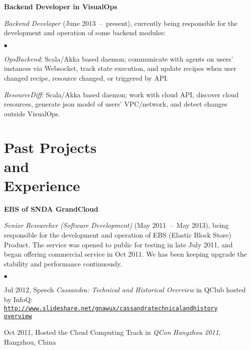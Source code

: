 \documentclass[a4paper,margin,line]{res}
\newenvironment{list1}{
  \begin{list}{\ding{113}}{%
      \setlength{\itemsep}{0in}
      \setlength{\parsep}{0in} \setlength{\parskip}{0in}
      \setlength{\topsep}{0in} \setlength{\partopsep}{0in} 
      \setlength{\leftmargin}{0.17in}}}{\end{list}}
\newenvironment{list2}{
  \begin{list}{$\bullet$}{%
      \setlength{\itemsep}{0in}
      \setlength{\parsep}{0in} \setlength{\parskip}{0in}
      \setlength{\topsep}{0in} \setlength{\partopsep}{0in} 
      \setlength{\leftmargin}{0.2in}}}{\end{list}}
\newcommand{\http}{http:/\hspace{-0.3ex}/}
\newcommand{\hindent}{\mbox{\hspace{8ex}}}
\begin{document}
\begin{resume}
\textbf{Backend Developer in VisualOps}\\
\vspace*{-.1in}
\begin{list1}
\item[] \emph{Backend Developer}\/ (June 2013~--~present), currently being responsible for the development and operation of some backend modules:
\begin{list2}
\vspace*{.05in}
\item \textit{OpsBackend}: Scala/Akka based daemon; communicate with agents on users' instances via Websocket, track state execution, and update recipes when user changed recipe, resource changed, or triggered by API.
\item \textit{ResourceDiff}: Scala/Akka based daemon; work with cloud API, discover cloud resources, generate json model of users' VPC/network, and detect changes outside VisualOps.
\end{list2}
\end{list1}

\section{\sc Past Projects\\ and\\ Experience}
\textbf{EBS of SNDA GrandCloud}\\
\vspace*{-.1in}
\begin{list1}
\item[] \emph{Senior Researcher (Software Development)}\/ (May 2011~--~May 2013), being responsible for the development and operation of EBS (Elastic Block Store) Product. The service was opened to public for testing in late July 2011, and began offering commercial service in Oct 2011. We has been keeping upgrade the stability and performance continuously.  
\begin{list2}
\vspace*{.05in}
\item Jul 2012, Speech \textit{Cassandra: Technical and Historical Overview}\/ in QClub hosted by InfoQ:\\ \hindent\href{http://www.slideshare.net/gnawux/cassandratechnicalandhistoryoverview}{\tt\http{}www.slideshare.net/gnawux/cassandratechnicalandhistory\\\hindent\hindent{}overview}
\item Oct 2011, Hosted the Cloud Computing Track in \emph{QCon Hangzhou 2011}, Hangzhou, China
\end{list2}
\end{list1}


\end{resume}
\end{document}
